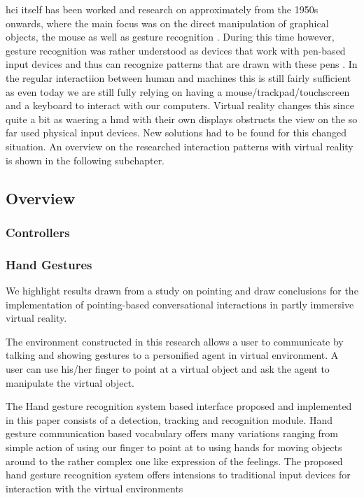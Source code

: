 \gls{hci} itself has been worked and research on approximately from the 1950s onwards, where the main focus was on the direct manipulation of graphical objects, the mouse as well as gesture recognition \citep{Myers1998}. During this time however, gesture recognition was rather understood as devices that work with pen-based input devices and thus can recognize patterns that are drawn with these pens \citep{Myers1998}. In the regular interactiion between human and machines this is still fairly sufficient as even today we are still fully relying on having a mouse/trackpad/touchscreen and a keyboard to interact with our computers. \newline
Virtual reality changes this since quite a bit as waering a \gls{hmd} with their own displays obstructs the view on the so far used physical input devices. New solutions had to be found for this changed situation. An overview on the researched interaction patterns with virtual reality is shown in the following subchapter.



\subsection{Overview}

\subsubsection{Controllers}

\subsubsection{Hand Gestures}

We highlight results drawn from a study on pointing and draw conclusions for the implementation of pointing-based conversational interactions in partly immersive virtual reality.
\cite{Pfeiffer2008}

The environment constructed in this research allows a user to communicate by talking and showing gestures
to a personified agent in virtual environment. A user can use his/her finger to point at a virtual object and ask the agent to manipulate the virtual object.
\cite{Uchino2008}

The Hand gesture recognition system based interface proposed and implemented in this paper consists of a detection, tracking and recognition module.
Hand gesture communication based vocabulary offers many variations ranging from simple action of using our finger to point at to using hands for moving objects around to the rather complex one like expression of the feelings. The proposed hand gesture recognition system offers intensions to traditional input devices for interaction with the virtual environments
\cite{Rautaray2011}

